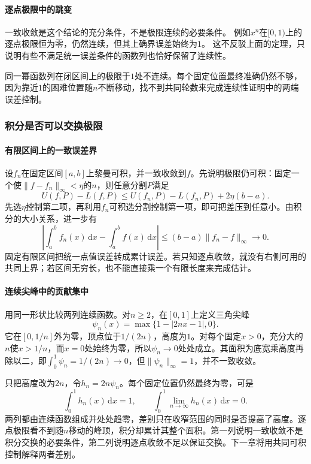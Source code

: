 \paragraph{逐点极限中的跳变}

一致收敛是这个结论的充分条件，不是极限连续的必要条件。
例如$x^n$在$[0,1)$上的逐点极限恒为零，仍然连续，但其上确界误差始终为$1$。
这不反驳上面的定理，只说明有些不满足统一误差条件的函数列也恰好保留了连续性。

同一幂函数列在闭区间上的极限于$1$处不连续。每个固定位置最终准确仍然不够，因为靠近$1$的困难位置随$n$不断移动，找不到共同轮数来完成连续性证明中的两端误差控制。

\subsubsection{积分是否可以交换极限}
\label{sec:analysis-classical-limit-integral}

\paragraph{有限区间上的一致误差界}

设$f_n$在固定区间$[a,b]$上黎曼可积，并一致收敛到$f$。先说明极限仍可积：固定一个使$\lVert f-f_n\rVert_\infty<\eta$的$n$，则任意分割$P$满足
\[
 U(f,P)-L(f,P)
 \leq U(f_n,P)-L(f_n,P)+2\eta(b-a).
\]
先选$\eta$控制第二项，再利用$f_n$可积选分割控制第一项，即可把差压到任意小。由积分的大小关系，进一步有
\begin{equation}
 \left|\int_a^bf_n(x)\,\mathrm dx-\int_a^bf(x)\,\mathrm dx\right|
 \leq(b-a)\lVert f_n-f\rVert_\infty\longrightarrow0.
\label{eq:analysis-uniform-riemann-limit}
\end{equation}
固定有限区间把统一点值误差转成累计误差。若只知逐点收敛，就没有右侧可用的共同上界；若区间无穷长，也不能直接乘一个有限长度来完成估计。

\paragraph{连续尖峰中的贡献集中}

用同一形状比较两列连续函数。对$n\geq2$，在$[0,1]$上定义三角尖峰
\[
 \psi_n(x)=\max\{1-|2nx-1|,0\}.
\]
它在$[0,1/n]$外为零，顶点位于$1/(2n)$，高度为$1$。对每个固定$x>0$，充分大的$n$使$x>1/n$，而$x=0$处始终为零，所以$\psi_n\to0$处处成立。其面积为底宽乘高度再除以二，即$\int_0^1\psi_n=1/(2n)\to0$，但$\lVert\psi_n\rVert_\infty=1$，并不一致收敛。

只把高度改为$2n$，令$h_n=2n\psi_n$。每个固定位置仍然最终为零，可是
\begin{equation}
 \int_0^1 h_n(x)\,\mathrm dx=1,
 \qquad \int_0^1\lim_{n\to\infty}h_n(x)\,\mathrm dx=0.
\label{eq:analysis-continuous-spike-integral-failure}
\end{equation}
两列都由连续函数组成并处处趋零，差别只在收窄范围的同时是否提高了高度。逐点极限看不到随$n$移动的峰顶，积分却累计其整个面积。第一列说明一致收敛不是积分交换的必要条件，第二列说明逐点收敛不足以保证交换。下一章将用共同可积控制解释两者差别。

